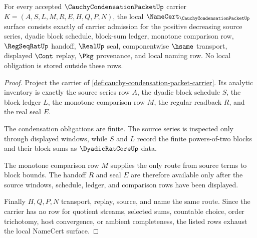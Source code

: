 \begin{theorem}
\label{thm:cauchy-condensation-packet-namecert-obligations}
For every accepted $\CauchyCondensationPacketUp$ carrier $K=(A,S,L,M,R,E,H,Q,P,N)$, the local $\NameCert_{\CauchyCondensationPacketUp}$ surface consists exactly of carrier admission for the positive decreasing source series, dyadic block schedule, block-sum ledger, monotone comparison row, $\RegSeqRatUp$ handoff, $\RealUp$ seal, componentwise $\hsame$ transport, displayed $\Cont$ replay, $\Pkg$ provenance, and local naming row. No local obligation is stored outside these rows.
\end{theorem}
\begin{proof}
Project the carrier of \autoref{def:cauchy-condensation-packet-carrier}. Its analytic inventory is exactly the source series row $A$, the dyadic block schedule $S$, the block ledger $L$, the monotone comparison row $M$, the regular readback $R$, and the real seal $E$.

The condensation obligations are finite. The source series is inspected only through displayed windows, while $S$ and $L$ record the finite powers-of-two blocks and their block sums as $\DyadicRatCoreUp$ data.

The monotone comparison row $M$ supplies the only route from source terms to block bounds. The handoff $R$ and seal $E$ are therefore available only after the source windows, schedule, ledger, and comparison rows have been displayed.

Finally $H,Q,P,N$ transport, replay, source, and name the same route. Since the carrier has no row for quotient streams, selected sums, countable choice, order trichotomy, host convergence, or ambient completeness, the listed rows exhaust the local NameCert surface.
\end{proof}

